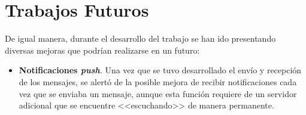 \section{Trabajos Futuros}
De igual manera, durante el desarrollo del trabajo se han ido presentando diversas mejoras que podrían realizarse en un futuro:

\begin{itemize}
	\item \textbf{Notificaciones \textit{push}}. Una vez que se tuvo desarrollado el envío y recepción de los mensajes, se alertó de la posible mejora de recibir notificaciones cada vez que se enviaba un mensaje, aunque esta función requiere de un servidor adicional que se encuentre <<escuchando>> de manera permanente.
\end{itemize}